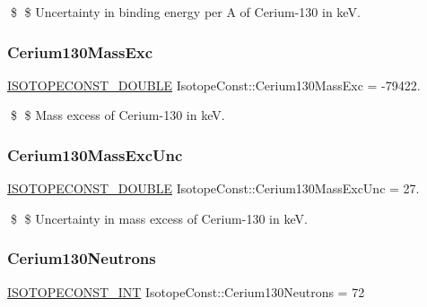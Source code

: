 \$ \$ Uncertainty in binding energy per A of Cerium-\/130 in keV. \mbox{\label{group___isotope_const-_cerium-_ce130_gaa217bc91f5dcd581193c3e08c5dfffce}} 
\subsubsection{\texorpdfstring{Cerium130\+Mass\+Exc}{Cerium130MassExc}}
{\footnotesize\ttfamily \mbox{\hyperlink{group___isotope_const-_macros_ga8f45a7272ce02c0b4c65c44636ed719a}{I\+S\+O\+T\+O\+P\+E\+C\+O\+N\+S\+T\+\_\+\+D\+O\+U\+B\+LE}} Isotope\+Const\+::\+Cerium130\+Mass\+Exc = -\/79422.}

\$ \$ Mass excess of Cerium-\/130 in keV. \mbox{\label{group___isotope_const-_cerium-_ce130_ga379c0f308b0cbf2293286862aca28aa2}} 
\subsubsection{\texorpdfstring{Cerium130\+Mass\+Exc\+Unc}{Cerium130MassExcUnc}}
{\footnotesize\ttfamily \mbox{\hyperlink{group___isotope_const-_macros_ga8f45a7272ce02c0b4c65c44636ed719a}{I\+S\+O\+T\+O\+P\+E\+C\+O\+N\+S\+T\+\_\+\+D\+O\+U\+B\+LE}} Isotope\+Const\+::\+Cerium130\+Mass\+Exc\+Unc = 27.}

\$ \$ Uncertainty in mass excess of Cerium-\/130 in keV. \mbox{\label{group___isotope_const-_cerium-_ce130_gaf988ec04bfa552a71cece6510388ec11}} 
\subsubsection{\texorpdfstring{Cerium130\+Neutrons}{Cerium130Neutrons}}
{\footnotesize\ttfamily \mbox{\hyperlink{group___isotope_const-_macros_ga5f18360b3e99483a35c32d789e62621c}{I\+S\+O\+T\+O\+P\+E\+C\+O\+N\+S\+T\+\_\+\+I\+NT}} Isotope\+Const\+::\+Cerium130\+Neutrons = 72}

